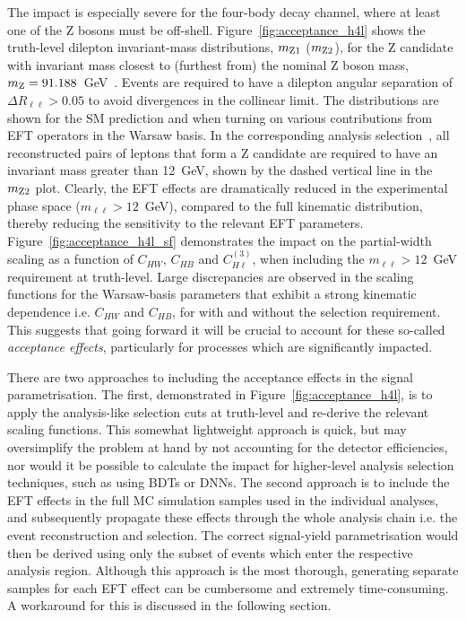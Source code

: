 The impact is especially severe for the four-body \Hfl decay channel, where at least one of the Z bosons must be off-shell. Figure~\ref{fig:acceptance_h4l} shows the truth-level dilepton invariant-mass distributions, $m_{\rm{Z1}}$ ($m_{\rm{Z2}}$), for the Z candidate with invariant mass closest to (furthest from) the nominal Z boson mass, $m_{\rm{Z}}=91.188$~GeV~\cite{Zyla:2020zbs}. Events are required to have a dilepton angular separation of $\Delta R_{\ell\ell} > 0.05$ to avoid divergences in the collinear limit. The distributions are shown for the SM prediction and when turning on various contributions from EFT operators in the Warsaw basis. In the corresponding analysis selection~\cite{Sirunyan:2021rug}, all reconstructed pairs of leptons that form a Z candidate are required to have an invariant mass greater than 12~GeV, shown by the dashed vertical line in the $m_{\rm{Z2}}$ plot. Clearly, the EFT effects are dramatically reduced in the experimental phase space ($m_{\ell\ell}>12$~GeV), compared to the full kinematic distribution, thereby reducing the sensitivity to the relevant EFT parameters. Figure~\ref{fig:acceptance_h4l_sf} demonstrates the impact on the \HZZ partial-width scaling as a function of $C_{HW}$, $C_{HB}$ and $C^{(3)}_{H\ell}$, when including the $m_{\ell\ell}>12$~GeV requirement at truth-level. Large discrepancies are observed in the scaling functions for the Warsaw-basis parameters that exhibit
a strong kinematic dependence i.e. $C_{HW}$ and $C_{HB}$, for with and without the selection requirement. This suggests that going forward it will be crucial to account for these so-called \textit{acceptance effects}, particularly for processes which are significantly impacted.


There are two approaches to including the acceptance effects in the signal parametrisation. The first, demonstrated in Figure~\ref{fig:acceptance_h4l}, is to apply the analysis-like selection cuts at truth-level and re-derive the relevant scaling functions. This somewhat lightweight approach is quick, but may oversimplify the problem at hand by not accounting for the detector efficiencies, nor would it be possible to calculate the impact for higher-level analysis selection techniques, such as using BDTs or DNNs. The second approach is to include the EFT effects in the full MC simulation samples used in the individual analyses, and subsequently propagate these effects through the whole analysis chain i.e. the event reconstruction and selection. The correct signal-yield parametrisation would then be derived using only the subset of events which enter the respective analysis region. Although this approach is the most thorough, generating separate samples for each EFT effect can be cumbersome and extremely time-consuming. A workaround for this is discussed in the following section.

